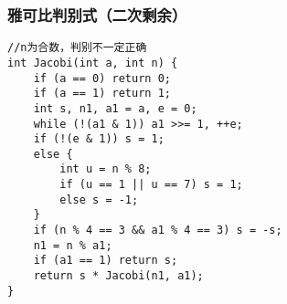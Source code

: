 \subsubsection{雅可比判别式（二次剩余）}
\begin{verbatim}
//n为合数，判别不一定正确
int Jacobi(int a, int n) {
	if (a == 0) return 0;
	if (a == 1) return 1;
	int s, n1, a1 = a, e = 0;
	while (!(a1 & 1)) a1 >>= 1, ++e;
	if (!(e & 1)) s = 1;
	else {
		int u = n % 8;
		if (u == 1 || u == 7) s = 1;
		else s = -1;
	}
	if (n % 4 == 3 && a1 % 4 == 3) s = -s;
	n1 = n % a1;
	if (a1 == 1) return s;
	return s * Jacobi(n1, a1);
}
\end{verbatim}
